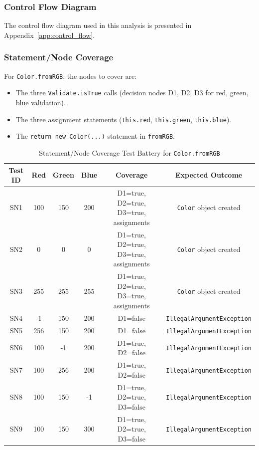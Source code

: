 \documentclass[11pt, a4paper]{article}
\begin{document}
\subsubsection{Control Flow Diagram}
The control flow diagram used in this analysis is presented in
Appendix~\ref{app:control_flow}.

\subsubsection{Statement/Node Coverage}
For \texttt{Color.fromRGB}, the nodes to cover are:
\begin{itemize}
    \item The three \texttt{Validate.isTrue} calls (decision nodes D1, D2, D3 for red, green, blue validation).
    \item The three assignment statements (\texttt{this.red}, \texttt{this.green}, \texttt{this.blue}).
    \item The \texttt{return new Color(...)} statement in \texttt{fromRGB}.
\end{itemize}

\begin{table}[H]
\centering
\caption{Statement/Node Coverage Test Battery for \texttt{Color.fromRGB}}
\label{tab:color_statement_node_coverage}
\begin{tabular}{cccccc}
\toprule
\textbf{Test ID} & \textbf{Red} & \textbf{Green} & \textbf{Blue} & \textbf{Coverage} & \textbf{Expected Outcome} \\
\midrule
SN1 & 100 & 150 & 200 & D1=true, D2=true, D3=true, assignments & \texttt{Color} object created \\
SN2 & 0 & 0 & 0 & D1=true, D2=true, D3=true, assignments & \texttt{Color} object created \\
SN3 & 255 & 255 & 255 & D1=true, D2=true, D3=true, assignments & \texttt{Color} object created \\
SN4 & -1 & 150 & 200 & D1=false & \texttt{IllegalArgumentException} \\
SN5 & 256 & 150 & 200 & D1=false & \texttt{IllegalArgumentException} \\
SN6 & 100 & -1 & 200 & D1=true, D2=false & \texttt{IllegalArgumentException} \\
SN7 & 100 & 256 & 200 & D1=true, D2=false & \texttt{IllegalArgumentException} \\
SN8 & 100 & 150 & -1 & D1=true, D2=true, D3=false & \texttt{IllegalArgumentException} \\
SN9 & 100 & 150 & 300 & D1=true, D2=true, D3=false & \texttt{IllegalArgumentException} \\
\bottomrule
\end{tabular}
\end{table}
\end{document}
